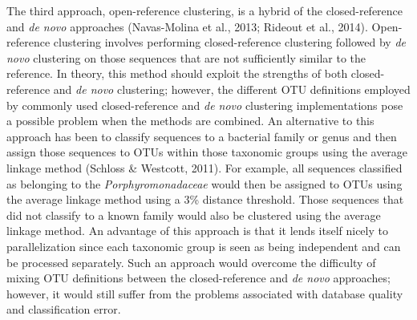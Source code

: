 \documentclass[11pt,]{article}
\begin{document}
The third approach, open-reference clustering, is a hybrid of the
closed-reference and \emph{de novo} approaches (Navas-Molina et al.,
2013; Rideout et al., 2014). Open-reference clustering involves
performing closed-reference clustering followed by \emph{de novo}
clustering on those sequences that are not sufficiently similar to the
reference. In theory, this method should exploit the strengths of both
closed-reference and \emph{de novo} clustering; however, the different
OTU definitions employed by commonly used closed-reference and \emph{de
novo} clustering implementations pose a possible problem when the
methods are combined. An alternative to this approach has been to
classify sequences to a bacterial family or genus and then assign those
sequences to OTUs within those taxonomic groups using the average
linkage method (Schloss \& Westcott, 2011). For example, all sequences
classified as belonging to the \emph{Porphyromonadaceae} would then be
assigned to OTUs using the average linkage method using a 3\% distance
threshold. Those sequences that did not classify to a known family would
also be clustered using the average linkage method. An advantage of this
approach is that it lends itself nicely to parallelization since each
taxonomic group is seen as being independent and can be processed
separately. Such an approach would overcome the difficulty of mixing OTU
definitions between the closed-reference and \emph{de novo} approaches;
however, it would still suffer from the problems associated with
database quality and classification error.
\end{document}
